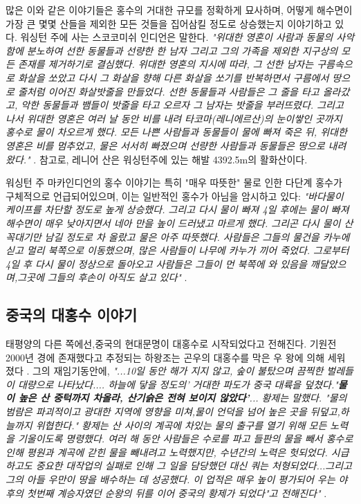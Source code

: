 \documentclass[10pt,twocolumn,letterpaper]{article}
\begin{document}
많은 이와 같은 이야기들은 홍수의 거대한 규모를 정확하게 묘사하며, 어떻게 해수면이  가장 큰 몇몇 산들을 제외한 모든 것들을 집어삼킬 정도로  상승했는지  이야기하고 있다. 워싱턴 주에 사는 스코코미쉬 인디언은 말한다. \textit{"위대한 영혼이 사람과 동물의 사악함에 분노하여 선한 동물들과 선량한 한 남자 그리고 그의 가족을 제외한 지구상의 모든 존재를 제거하기로 결심했다. 위대한 영혼의 지시에 따라, 그 선한 남자는 구름속으로 화살을 쏘았고 다시 그 화살을 향해 다른 화살을 쏘기를 반복하면서 구름에서 땅으로 줄처럼 이어진 화살밧줄을 만들었다. 선한 동물들과 사람들은 그 줄을 타고 올라갔고, 악한 동물들과 뱀들이 밧줄을 타고 오르자 그 남자는 밧줄을 부러뜨렸다. 그리고 나서 위대한 영혼은 여러 날 동안 비를 내려 타코마(레니에르산)의 눈이쌓인 곳까지 홍수로 물이 차오르게 했다. 모든 나쁜 사람들과 동물들이 물에 빠져 죽은 뒤, 위대한 영혼은 비를 멈추었고, 물은 서서히 빠졌으며 선량한 사람들과 동물들은 땅으로 내려왔다."} \cite{3}. 참고로, 레니어 산은 워싱턴주에 있는 해발 4392.5m의 활화산이다. 

워싱턴 주 마카인디언의 홍수 이야기는 특히 "매우 따뜻한" 물로 인한 다단계 홍수가 구체적으로 언급되어있으며, 이는 일반적인 홍수가 아님을 암시하고 있다: \textit{"바다물이  케이프를 차단할 정도로 높게 상승했다. 그리고 다시 물이 빠져 4일 후에는 물이 빠져 해수면이 매우 낮아지면서 네아 만을 높이 드러냈고 마르게 했다. 그리곤 다시  물이 산 꼭대기만 남길 정도로 차 올랐고 물은 아주 따뜻했다. 사람들은 그들의 물건을 카누에 싣고 멀리 북쪽으로 이동했으며, 많은 사람들이 나무에 카누가 끼어 죽었다. 그로부터 4일 후 다시 물이 정상으로 돌아오고 사람들은 그들이 먼 북쪽에 와 있음을 깨달았으며,그곳에 그들의 후손이 아직도 살고 있다"} \cite{3}.

\subsection{중국의 대홍수 이야기}

태평양의 다른 쪽에선,중국의 현대문명이 대홍수로 시작되었다고 전해진다. 기원전 2000년 경에 존재했다고 추정되는 하왕조는 곤우의 대홍수를 막은 우 왕에 의해 세워졌다 \cite{6}. 그의 재임기동안에, \textit{"...10일 동안 해가 지지 않고, 숲이 불탔으며 끔찍한 벌레들이 대량으로 나타났다.... 하늘에 닿을 정도의’ 거대한 파도가 중국 대륙을 덮쳤다."\textbf{물이 높은 산 중턱까지 차올라, 산기슭은 전혀 보이지 않았다'}... 황제는 말했다. "물의 범람은 파괴적이고 광대한 지역에 영향을 미쳐,물이 언덕을 넘어 높은 곳을 뒤덮고,하늘까지 위협한다." 황제는 산 사이의 계곡에 차있는 물의 출구를 열기 위해 모든 노력을 기울이도록 명령했다. 여러 해 동안 사람들은 수로를 파고 들판의 물을 빼서 홍수로 인해 평원과 계곡에 갇힌 물을 빼내려고 노력했지만, 수년간의 노력은 헛되었다. 시급하고도 중요한 대작업의 실패로 인해 그 일을 담당했던 대신 쿼는 처형되었다...그리고 그의 아들 우만이 땅을 배수하는 데 성공했다. 이 업적은 매우 높이 평가되어 우는 야후의 첫번째 계승자였던 순왕의 뒤를 이어 중국의 황제가 되었다"고 전해진다"} \cite{5}.
\end{document}
